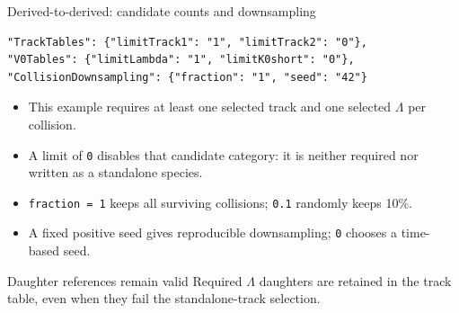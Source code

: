 \begin{frame}[fragile]{Derived-to-derived: candidate counts and downsampling}
 \begin{lstlisting}
"TrackTables": {"limitTrack1": "1", "limitTrack2": "0"},
"V0Tables": {"limitLambda": "1", "limitK0short": "0"},
"CollisionDownsampling": {"fraction": "1", "seed": "42"}
 \end{lstlisting}
 \begin{itemize}
 \item This example requires at least one selected track and one selected $\Lambda$ per collision.
 \item A limit of \texttt{0} disables that candidate category: it is neither required nor written as a standalone species.
 \item \texttt{fraction = 1} keeps all surviving collisions; \texttt{0.1} randomly keeps 10\%.
 \item A fixed positive seed gives reproducible downsampling; \texttt{0} chooses a time-based seed.
 \end{itemize}
 \begin{block}{Daughter references remain valid}
 \small Required $\Lambda$ daughters are retained in the track table, even when they fail the standalone-track selection.
 \end{block}
\end{frame}

